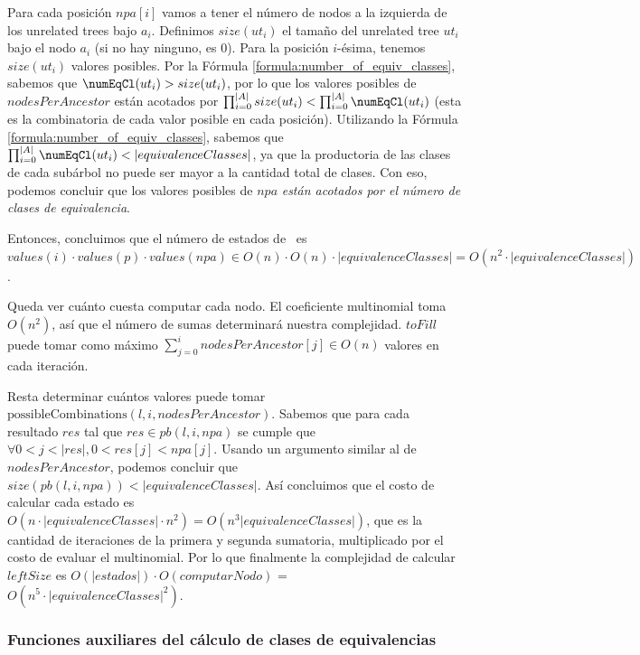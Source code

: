 Para cada posición $npa[i]$ vamos a tener el número de nodos a la izquierda de los unrelated trees bajo $a_i$. Definimos $size(ut_i)$ el tamaño del unrelated tree $ut_i$ bajo el nodo $a_i$ (si no hay ninguno, es 0). Para la posición $i$-ésima, tenemos $size(ut_i)$ valores posibles. Por la Fórmula \ref{formula:number_of_equiv_classes}, sabemos que $\numEqCl(ut_i) > size(ut_i)$, por lo que los valores posibles de $nodesPerAncestor$ están acotados por $\prod_{i=0}^{|A|} size(ut_i) < \prod_{i=0}^{|A|} \numEqCl(ut_i)$ (esta es la combinatoria de cada valor posible en cada posición). Utilizando la Fórmula \ref{formula:number_of_equiv_classes}, sabemos que $\prod_{i=0}^{|A|} \numEqCl(ut_i) < |equivalenceClasses|$, ya que la productoria de las clases de cada subárbol no puede ser mayor a la cantidad total de clases. Con eso, podemos concluir que los valores posibles de $npa$ \emph{están acotados por el número de clases de equivalencia}.

Entonces, concluimos que el número de estados de \leftPossibleOrders \ es $values(i) \cdot values(p) \cdot values(npa) \in O(n) \cdot O(n) \cdot |equivalenceClasses| = O(n^2 \cdot |equivalenceClasses|)$.

Queda ver cuánto cuesta computar cada nodo. El coeficiente multinomial toma $O(n^2)$, así que el número de sumas determinará nuestra complejidad. $toFill$ puede tomar como máximo $\sum_{j=0}^i nodesPerAncestor[j] \in O(n)$ valores en cada iteración. 

Resta determinar cuántos valores puede tomar $\mathrm{possibleCombinations}(l,i,nodesPerAncestor)$. Sabemos que para cada resultado $res$ tal que $res \in pb(l,i,npa)$ se cumple que $\forall 0<j<|res|, 0<res[j]<npa[j]$. Usando un argumento similar al de $nodesPerAncestor$, podemos concluir que $size(pb(l,i,npa)) < |equivalenceClasses|$. Así concluimos que el costo de calcular cada estado es $O(n \cdot |equivalenceClasses| \cdot n^2) = O(n^3 |equivalenceClasses|) $, que es la cantidad de iteraciones de la primera y segunda sumatoria, multiplicado por el costo de evaluar el multinomial. Por lo que finalmente la complejidad de calcular $leftSize$ es $O(|estados|)\cdot O(computarNodo)$ = $O(n^5 \cdot |equivalenceClasses|^2)$.

\subsubsection{Funciones auxiliares del cálculo de clases de equivalencias} \label{subsubSection:auxiliaryFormulasEquivalenceClasses}

